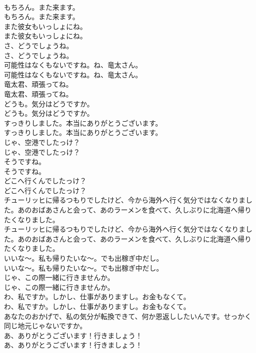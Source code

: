 \documentclass[8pt]{extreport}
\begin{document}
\begin{CJK}{UTF8}{min}
\\	もちろん。また来ます。	
\\	もちろん。また来ます。 
\\	また彼女もいっしょにね。	
\\	また彼女もいっしょにね。 
\\	さ、どうでしょうね。	
\\	さ、どうでしょうね。 
\\	可能性はなくもないですね。ね、竜太さん。	
\\	可能性はなくもないですね。ね、竜太さん。 
\\	竜太君、頑張ってね。	
\\	竜太君、頑張ってね。 
\\	どうも。気分はどうですか。	
\\	どうも。気分はどうですか。 
\\	すっきりしました。本当にありがとうございます。	
\\	すっきりしました。本当にありがとうございます。 
\\	じゃ、空港でしたっけ？	
\\	じゃ、空港でしたっけ？ 
\\	そうですね。	
\\	そうですね。 
\\	どこへ行くんでしたっけ？	
\\	どこへ行くんでしたっけ？ 
\\	チューリッヒに帰るつもりでしたけど、今から海外へ行く気分ではなくなりました。あのおばあさんと会って、あのラーメンを食べて、久しぶりに北海道へ帰りたくなりました。	
\\	チューリッヒに帰るつもりでしたけど、今から海外へ行く気分ではなくなりました。あのおばあさんと会って、あのラーメンを食べて、久しぶりに北海道へ帰りたくなりました。 
\\	いいな〜。私も帰りたいな〜。でも出稼ぎ中だし。	
\\	いいな〜。私も帰りたいな〜。でも出稼ぎ中だし。 
\\	じゃ、この際一緒に行きませんか。	
\\	じゃ、この際一緒に行きませんか。 
\\	わ、私ですか。しかし、仕事がありますし。お金もなくて。	
\\	わ、私ですか。しかし、仕事がありますし。お金もなくて。 
\\	あなたのおかげで、私の気分が転換できて、何か恩返ししたいんです。せっかく同じ地元じゃないですか。	
\\	あ、ありがとうございます！行きましょう！	
\\	あ、ありがとうございます！行きましょう！ 

\end{CJK}
\end{document}
